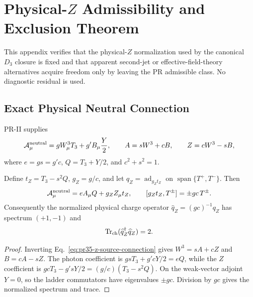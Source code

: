 \section{Physical-\texorpdfstring{$Z$}{Z} Admissibility and Exclusion Theorem}
\label{app:physical-z-hessian-obstruction}

This appendix verifies that the physical-$Z$ normalization used by the canonical $D_3$ closure is fixed and that apparent second-jet or effective-field-theory alternatives acquire freedom only by leaving the PR admissible class.  No diagnostic residual is used.

\subsection{Exact Physical Neutral Connection}

PR-II supplies
\begin{equation}
 \mathcal A_\mu^{\rm neutral}
 =gW_\mu^3T_3+g'B_\mu\frac{Y}{2},
 \qquad A=sW^3+cB,\qquad Z=cW^3-sB,
 \label{eq:pr35-z-source-connection}
\end{equation}
where $e=gs=g'c$, $Q=T_3+Y/2$, and $c^2+s^2=1$.

\begin{proposition}
\label{prop:pr35-physical-z-generator}
Define $t_Z=T_3-s^2Q$, $g_Z=g/c$, and let
$q_Z=\operatorname{ad}_{g_Zt_Z}$ on
$\operatorname{span}\{T^+,T^-\}$.  Then
\begin{equation}
 \mathcal A_\mu^{\rm neutral}=eA_\mu Q+g_ZZ_\mu t_Z,
 \qquad [g_Zt_Z,T^\pm]=\pm gc\,T^\pm.
\end{equation}
Consequently the normalized physical charge operator
$\widehat q_Z=(gc)^{-1}q_Z$ has spectrum $(+1,-1)$ and
\begin{equation}
 \operatorname{Tr}_{\rm ch}
 (\widehat q_Z^\dagger\widehat q_Z)=2.
 \label{eq:pr35-z-physical-vector-trace}
\end{equation}
\end{proposition}

\begin{proof}
Inverting Eq.~\eqref{eq:pr35-z-source-connection} gives $W^3=sA+cZ$ and $B=cA-sZ$.  The photon coefficient is $gsT_3+g'cY/2=eQ$, while the $Z$ coefficient is $gcT_3-g'sY/2=(g/c)(T_3-s^2Q)$.  On the weak-vector adjoint $Y=0$, so the ladder commutators have eigenvalues $\pm gc$.  Division by $gc$ gives the normalized spectrum and trace.
\end{proof}

